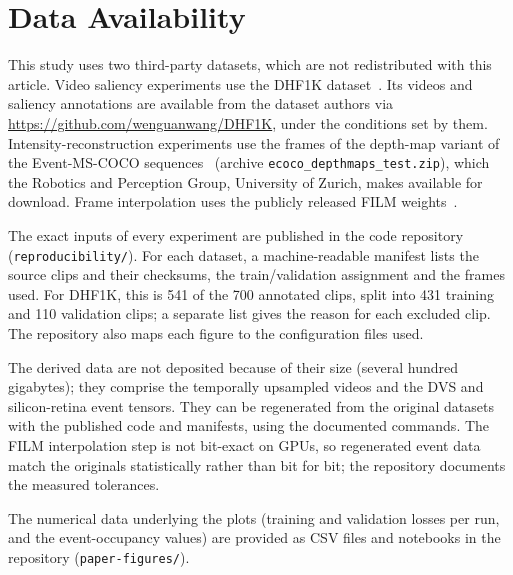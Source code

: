 
\section*{Data Availability}
This study uses two third-party datasets, which are not redistributed with this article.
Video saliency experiments use the DHF1K dataset~\cite{wang2018revisiting}. Its videos and saliency
annotations are available from the dataset authors via \url{https://github.com/wenguanwang/DHF1K}, under
the conditions set by them. Intensity-reconstruction experiments use the frames of the depth-map variant
of the Event-MS-COCO sequences~\cite{rebecq2019high} (archive \texttt{ecoco\_depthmaps\_test.zip}), which
the Robotics and Perception Group, University of Zurich, makes available for download.
Frame interpolation uses the publicly released FILM weights~\cite{reda2022film}.

The exact inputs of every experiment are published in the code repository (\texttt{reproducibility/}).
For each dataset, a machine-readable manifest lists the source clips and their checksums, the
train/validation assignment and the frames used. For DHF1K, this is 541 of the 700 annotated clips,
split into 431 training and 110 validation clips; a separate list gives the reason for each excluded
clip.
The repository also maps each figure to the configuration files used.

The derived data are not deposited because of their size (several hundred gigabytes); they comprise
the temporally upsampled videos and the DVS and silicon-retina event tensors. They can be regenerated
from the original datasets with the published code and manifests, using the documented commands. The
FILM interpolation step is not bit-exact on GPUs, so regenerated event data match the originals
statistically rather than bit for bit; the repository documents the measured tolerances.

The numerical data underlying the plots (training and validation losses per run, and the event-occupancy
values) are provided as CSV files and notebooks in the repository (\texttt{paper-figures/}).

